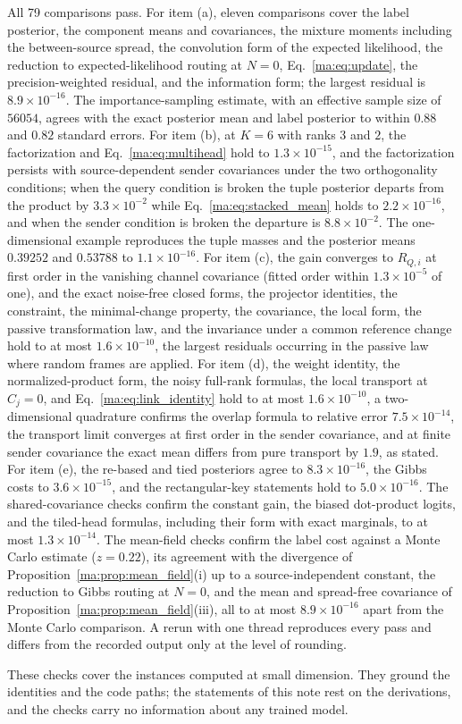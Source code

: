 \documentclass[11pt]{article}
\theoremstyle{definition}
\theoremstyle{remark}
\begin{document}
All 79 comparisons pass. For item (a), eleven comparisons cover the label posterior, the component means and covariances, the mixture moments including the between-source spread, the convolution form of the expected likelihood, the reduction to expected-likelihood routing at $N=0$, Eq.~\eqref{ma:eq:update}, the precision-weighted residual, and the information form; the largest residual is $8.9\times10^{-16}$. The importance-sampling estimate, with an effective sample size of $56054$, agrees with the exact posterior mean and label posterior to within $0.88$ and $0.82$ standard errors. For item (b), at $K=6$ with ranks $3$ and $2$, the factorization and Eq.~\eqref{ma:eq:multihead} hold to $1.3\times10^{-15}$, and the factorization persists with source-dependent sender covariances under the two orthogonality conditions; when the query condition is broken the tuple posterior departs from the product by $3.3\times10^{-2}$ while Eq.~\eqref{ma:eq:stacked_mean} holds to $2.2\times10^{-16}$, and when the sender condition is broken the departure is $8.8\times10^{-2}$. The one-dimensional example reproduces the tuple masses and the posterior means $0.39252$ and $0.53788$ to $1.1\times10^{-16}$. For item (c), the gain converges to $R_{Q,i}$ at first order in the vanishing channel covariance (fitted order within $1.3\times10^{-5}$ of one), and the exact noise-free closed forms, the projector identities, the constraint, the minimal-change property, the covariance, the local form, the passive transformation law, and the invariance under a common reference change hold to at most $1.6\times10^{-10}$, the largest residuals occurring in the passive law where random frames are applied. For item (d), the weight identity, the normalized-product form, the noisy full-rank formulas, the local transport at $C_j=0$, and Eq.~\eqref{ma:eq:link_identity} hold to at most $1.6\times10^{-10}$, a two-dimensional quadrature confirms the overlap formula to relative error $7.5\times10^{-14}$, the transport limit converges at first order in the sender covariance, and at finite sender covariance the exact mean differs from pure transport by $1.9$, as stated. For item (e), the re-based and tied posteriors agree to $8.3\times10^{-16}$, the Gibbs costs to $3.6\times10^{-15}$, and the rectangular-key statements hold to $5.0\times10^{-16}$. The shared-covariance checks confirm the constant gain, the biased dot-product logits, and the tiled-head formulas, including their form with exact marginals, to at most $1.3\times10^{-14}$. The mean-field checks confirm the label cost against a Monte Carlo estimate ($z=0.22$), its agreement with the divergence of Proposition~\ref{ma:prop:mean_field}(i) up to a source-independent constant, the reduction to Gibbs routing at $N=0$, and the mean and spread-free covariance of Proposition~\ref{ma:prop:mean_field}(iii), all to at most $8.9\times10^{-16}$ apart from the Monte Carlo comparison. A rerun with one thread reproduces every pass and differs from the recorded output only at the level of rounding.

These checks cover the instances computed at small dimension. They ground the identities and the code paths; the statements of this note rest on the derivations, and the checks carry no information about any trained model.



\end{document}
